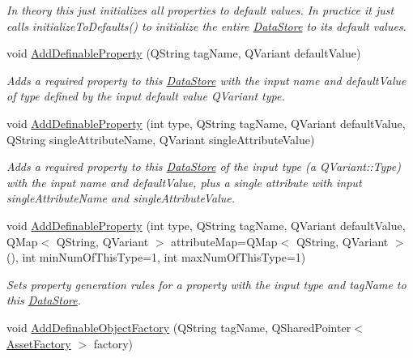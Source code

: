 \begin{DoxyCompactItemize}
\begin{DoxyCompactList}\small\item\em In theory this just initializes all properties to default values. In practice it just calls initialize\-To\-Defaults() to initialize the entire \hyperlink{class_picto_1_1_data_store}{Data\-Store} to its default values. \end{DoxyCompactList}\item 
void \hyperlink{class_picto_1_1_data_store_aa26b8b2191fa50b0f963b1d94a6e3407}{Add\-Definable\-Property} (Q\-String tag\-Name, Q\-Variant default\-Value)
\begin{DoxyCompactList}\small\item\em Adds a required property to this \hyperlink{class_picto_1_1_data_store}{Data\-Store} with the input name and default\-Value of type defined by the input default value Q\-Variant type. \end{DoxyCompactList}\item 
void \hyperlink{class_picto_1_1_data_store_a7f4ee4cdb767cdce307d2488beba8d4b}{Add\-Definable\-Property} (int type, Q\-String tag\-Name, Q\-Variant default\-Value, Q\-String single\-Attribute\-Name, Q\-Variant single\-Attribute\-Value)
\begin{DoxyCompactList}\small\item\em Adds a required property to this \hyperlink{class_picto_1_1_data_store}{Data\-Store} of the input type (a Q\-Variant\-::\-Type) with the input name and default\-Value, plus a single attribute with input single\-Attribute\-Name and single\-Attribute\-Value. \end{DoxyCompactList}\item 
void \hyperlink{class_picto_1_1_data_store_ae871df5c35ccb340a375a6b59d7d1bd2}{Add\-Definable\-Property} (int type, Q\-String tag\-Name, Q\-Variant default\-Value, Q\-Map$<$ Q\-String, Q\-Variant $>$ attribute\-Map=Q\-Map$<$ Q\-String, Q\-Variant $>$(), int min\-Num\-Of\-This\-Type=1, int max\-Num\-Of\-This\-Type=1)
\begin{DoxyCompactList}\small\item\em Sets property generation rules for a property with the input type and tag\-Name to this \hyperlink{class_picto_1_1_data_store}{Data\-Store}. \end{DoxyCompactList}\item 
void \hyperlink{class_picto_1_1_data_store_a8a1c8ece2f1cbc05471ecff11e050ddb}{Add\-Definable\-Object\-Factory} (Q\-String tag\-Name, Q\-Shared\-Pointer$<$ \hyperlink{class_picto_1_1_asset_factory}{Asset\-Factory} $>$ factory)

\end{DoxyCompactItemize}
